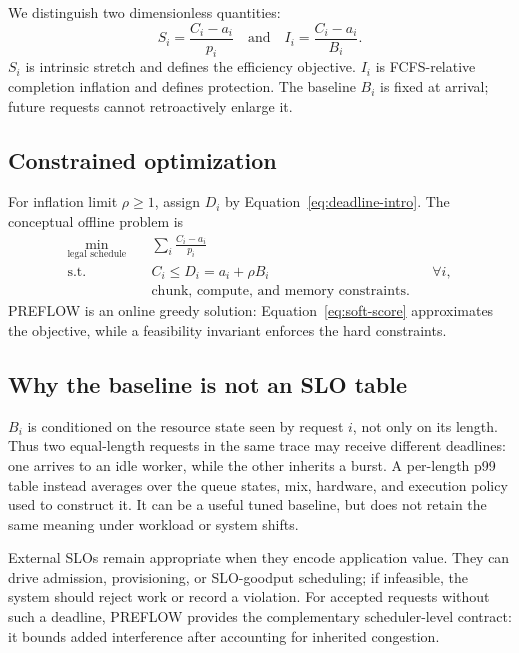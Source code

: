 \documentclass{article}
\newcommand{\preflow}{\textnormal{\textsc{PREFLOW}}}
\begin{document}
We distinguish two dimensionless quantities:
\begin{equation}
    S_i=\frac{C_i-a_i}{p_i}
    \quad\text{and}\quad
    I_i=\frac{C_i-a_i}{B_i}.
    \label{eq:two-normalizers}
\end{equation}
$S_i$ is intrinsic stretch and defines the efficiency objective.  $I_i$ is
FCFS-relative completion inflation and defines protection.  The baseline $B_i$
is fixed at arrival; future requests cannot retroactively enlarge it.

\subsection{Constrained optimization}

For inflation limit $\rho\geq1$, assign $D_i$ by
Equation~\eqref{eq:deadline-intro}.  The conceptual offline problem is
\begin{align}
    \min_{\text{legal schedule}}\quad
        &\sum_i \frac{C_i-a_i}{p_i}
        \label{eq:optimization}\\
    \text{s.t.}\quad
        &C_i\leq D_i=a_i+\rho B_i && \forall i,\nonumber\\
        &\text{chunk, compute, and memory constraints.}&&\nonumber
\end{align}
\preflow{} is an online greedy solution: Equation~\eqref{eq:soft-score}
approximates the objective, while a feasibility invariant enforces the hard
constraints.

\subsection{Why the baseline is not an SLO table}

$B_i$ is conditioned on the resource state seen by request $i$, not only on its
length.  Thus two equal-length requests in the same trace may receive different
deadlines: one arrives to an idle worker, while the other inherits a burst.  A
per-length p99 table instead averages over the queue states, mix, hardware, and
execution policy used to construct it.  It can be a useful tuned baseline, but
does not retain the same meaning under workload or system shifts.

External SLOs remain appropriate when they encode application value.  They can
drive admission, provisioning, or SLO-goodput scheduling; if infeasible, the
system should reject work or record a violation.  For accepted requests without
such a deadline, \preflow{} provides the complementary scheduler-level
contract: it bounds added interference after accounting for inherited
congestion.
\end{document}
